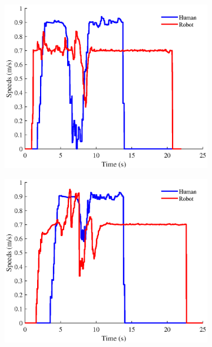 \begin{figure}[h!]
\centering
\hspace{-0.15cm}
\begin{subfigure}{.52\columnwidth}
  \includegraphics[width=\textwidth]{images/chapter6/vel_smb.eps}
\end{subfigure}
\hspace{-0.75cm}
\begin{subfigure}{.52\columnwidth}
  \includegraphics[width=\textwidth]{images/chapter6/vel_cohan.eps}
\end{subfigure}
\begin{subfigure}{.45\columnwidth}

\end{subfigure}
\end{figure}
